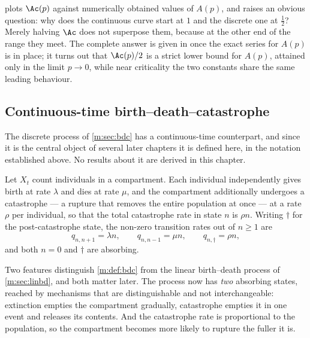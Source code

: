  plots $\Ac(p)$ against numerically obtained values of $A(p)$,
and raises an obvious question: why does the continuous curve start at $1$ and the
discrete one at $\tfrac12$? Merely halving $\Ac$ does not superpose them, because
at the other end of the range they meet. The complete answer is given in \ChA{}
once the exact series for $A(p)$ is in place; it turns out that $\Ac(p)/2$ is a
strict lower bound for $A(p)$, attained only in the limit $p\to0$, while near
criticality the two constants share the same leading behaviour.

\subsection{Continuous-time birth--death--catastrophe}
\label{m:sec:ctbdc}

The discrete process of \cref{m:sec:bdc} has a continuous-time counterpart, and
since it is the central object of several later chapters it is defined here, in the
notation established above. No results about it are derived in this chapter.

\begin{definition}
\label{m:def:bdc}
Let $X_t$ count individuals in a compartment. Each individual independently gives
birth at rate $\lambda$ and dies at rate $\mu$, and the compartment additionally
undergoes a catastrophe --- a rupture that removes the entire population at once
--- at a rate $\rho$ per individual, so that the total catastrophe rate in state
$n$ is $\rho n$. Writing $\dagger$ for the post-catastrophe state, the non-zero
transition rates out of $n\ge1$ are
\begin{equation}
\label{m:eq:bdcrates}
q_{n,n+1} = \lambda n,
\qquad
q_{n,n-1} = \mu n,
\qquad
q_{n,\dagger} = \rho n ,
\end{equation}
and both $n=0$ and $\dagger$ are absorbing.
\end{definition}

Two features distinguish \cref{m:def:bdc} from the linear birth--death process of
\cref{m:sec:linbd}, and both matter later. The process now has \emph{two} absorbing
states, reached by mechanisms that are distinguishable and not interchangeable:
extinction empties the compartment gradually, catastrophe empties it in one event
and releases its contents. And the catastrophe rate is proportional to the
population, so the compartment becomes more likely to rupture the fuller it is.


